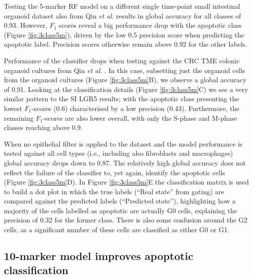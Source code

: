 Testing the 5-marker RF model on a different single time-point small intestinal organoid dataset also from Qin \textit{et al}. \cite{qin_cell-type-specific_2020} results in global accuracy for all classes of 0.93. However, $F_1$ scores reveal a big performance drop with the apoptotic class (Figure \ref{fig:3class5m}), driven by the low 0.5 precision score when predicting the apoptotic label. Precision scores otherwise remain above 0.92 for the other labels.

Performance of the classifier drops when testing against the CRC TME colonic organoid cultures from Qin \textit{et al}. \cite{qin_cell-type-specific_2020}. In this case, subsetting just the organoid cells from the organoid cultures (Figure \ref{fig:3class5m}B), we observe a global accuracy of 0.91. Looking at the classification details (Figure \ref{fig:3class5m}C) we see a very similar pattern to the SI LGR5 results; with the apoptotic class presenting the lowest $F_1$-scores (0.6) characterised by a low precision (0.43). Furthermore, the remaining $F_1$-scores are also lower overall, with only the S-phase and M-phase classes reaching above 0.9.

When no epithelial filter is applied to the dataset and the model performance is tested against all cell types (i.e., including also fibroblasts and macrophages) global accuracy drops down to 0.87. The relatively high global accuracy does not reflect the failure of the classifier to, yet again, identify the apoptotic cells (Figure \ref{fig:3class5m}D). In Figure \ref{fig:3class5m}E the classification matrix is used to build a dot plot in which the true labels (“Real state” from gating) are compared against the predicted labels (“Predicted state”), highlighting how a majority of the cells labelled as apoptotic are actually G0 cells, explaining the precision of 0.32 for the former class. There is also some confusion around the G2 cells, as a significant number of these cells are classified as either G0 or G1.

\subsection{10-marker model improves apoptotic classification}

